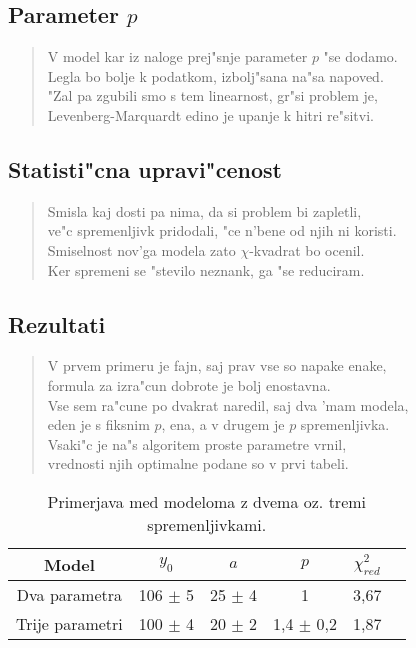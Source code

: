 \documentclass[a4paper,10pt]{article}
\begin{document}
\subsection{Parameter $p$}

\begin{verse}
V model kar iz naloge prej"snje parameter $p$ "se dodamo. \\ 
Legla bo bolje k podatkom, izbolj"sana na"sa napoved. \\
"Zal pa zgubili smo s tem linearnost, gr"si problem je, \\
Levenberg-Marquardt edino je upanje k hitri re"sitvi.
\end{verse}

\subsection{Statisti"cna upravi"cenost}
\begin{verse}
 Smisla kaj dosti pa nima, da si problem bi zapletli, \\
 ve"c spremenljivk pridodali, "ce n'bene od njih ni koristi. \\
 Smiselnost nov'ga modela zato $\chi$-kvadrat bo ocenil. \\
 Ker spremeni se "stevilo neznank, ga "se reduciram. 
\end{verse}

\subsection{Rezultati}
\begin{verse}
 V prvem primeru je fajn, saj prav vse so napake enake, \\
 formula za izra"cun dobrote je bolj enostavna. \\
 Vse sem ra"cune po dvakrat naredil, saj dva 'mam modela, \\
 eden je s fiksnim $p$, ena, a v drugem je $p$ spremenljivka. \\
 Vsaki"c je na"s algoritem proste parametre vrnil, \\
 vrednosti njih optimalne podane so v prvi tabeli. 
\end{verse}

\begin{table}[h]
 \centering
\begin{tabular}{|c|c|c|c|c|c|}
 \hline
  Model & $y_0$ & $a$ & $p$ & $\chi^2_{red}$ \\
\hline
  Dva parametra & 106 $\pm$ 5 & 25 $\pm$ 4 & 1 & 3,67 \\
  Trije parametri & 100 $\pm$ 4 & 20 $\pm$ 2 & 1,4 $\pm$ 0,2 & 1,87 \\
\hline
\end{tabular}
\caption{Primerjava med modeloma z dvema oz. tremi spremenljivkami. }
\label{tab:farmacija}
\end{table}
\end{document}
